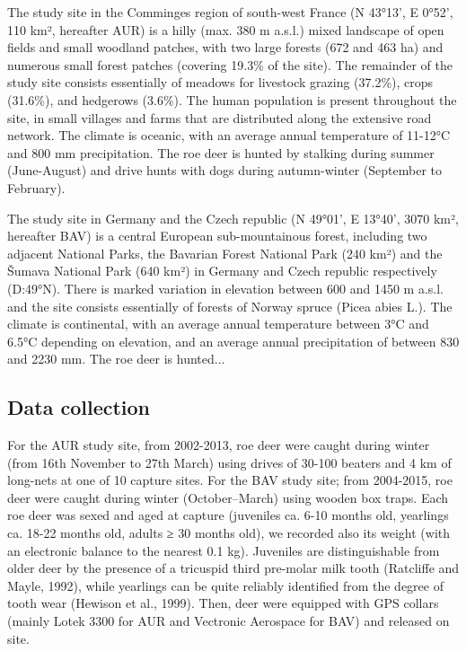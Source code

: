 \documentclass[a4paper,11pt]{article}
\begin{document}
The study site in the Comminges region of south-west France (N 43°13', E 0°52', 110 km², hereafter AUR) is a hilly (max. 380 m a.s.l.) mixed landscape of open fields and small woodland patches, with two large forests (672 and 463 ha) and numerous small forest patches (covering 19.3\% of the site). The remainder of the study site consists essentially of meadows for livestock grazing (37.2\%), crops (31.6\%), and hedgerows (3.6\%). The human population is present throughout the site, in small villages and farms that are distributed along the extensive road network. The climate is oceanic, with an average annual temperature of 11-12°C and 800 mm precipitation. The roe deer is hunted by stalking during summer (June-August) and drive hunts with dogs during autumn-winter (September to February). 

The study site in Germany and the Czech republic (N 49°01', E 13°40', 3070 km², hereafter BAV) is a central European sub-mountainous forest, including two adjacent National Parks, the Bavarian Forest National Park (240 km²) and the Šumava National Park (640 km²) in Germany and Czech republic respectively (D:49°N). There is marked variation in elevation between 600 and 1450 m a.s.l. and the site consists essentially of forests of Norway spruce (Picea abies L.). The climate is continental, with an average annual temperature between 3°C and 6.5°C depending on elevation, and an average annual precipitation of between 830 and 2230 mm. The roe deer is hunted...

\subsection{Data collection}
For the AUR study site, from 2002-2013, roe deer were caught during winter (from 16th November to 27th March) using drives of 30-100 beaters and 4 km of long-nets at one of 10 capture sites. For the BAV study site; from 2004-2015, roe deer were caught during winter (October–March) using wooden box traps. Each roe deer was sexed and aged at capture (juveniles ca. 6-10 months old, yearlings ca. 18-22 months old, adults ≥ 30 months old), we recorded also its weight (with an electronic balance to the nearest 0.1 kg). Juveniles are distinguishable from older deer by the presence of a tricuspid third pre-molar milk tooth (Ratcliffe and Mayle, 1992), while yearlings can be quite reliably identified from the degree of tooth wear (Hewison et al., 1999). Then, deer were equipped with GPS collars (mainly Lotek 3300 for AUR and Vectronic Aerospace for BAV) and released on site. 
\end{document}
